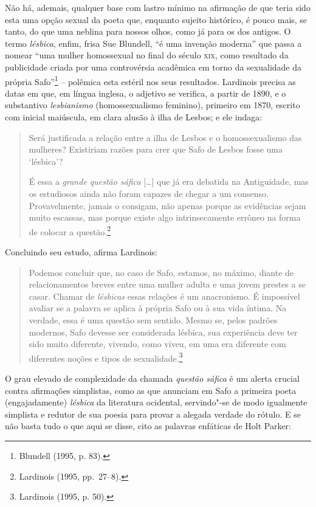 \noindent{}Não há,
ademais, qualquer base com lastro mínimo na afirmação de que teria sido esta
uma opção sexual da poeta que, enquanto sujeito histórico, é pouco mais, se
tanto, do que uma neblina para nossos olhos, como já para os dos antigos. O
termo \textit{lésbica}, enfim, frisa Sue Blundell, “é uma
invenção moderna” que passa a nomear “uma mulher homossexual no final do século
\textsc{xix}, como resultado da publicidade criada por uma controvérsia acadêmica em
torno da sexualidade da própria Safo”\footnote{ Blundell (1995, p. 83).} -- polêmica esta 
estéril nos seus resultados.
Lardinois precisa as datas em que, em
língua inglesa, o adjetivo se verifica, a partir de 1890, e o substantivo
\textit{lesbianismo} (homossexualismo feminino), primeiro em 1870, escrito com
inicial maiúscula, em clara alusão à ilha de Lesbos; e ele indaga:

\begin{quote}
Será justificada a relação entre a ilha de Lesbos e o homossexualismo das
mulheres? Existiriam razões para crer que Safo de Lesbos fosse uma ‘lésbica’?

É essa a \textit{grande questão sáfica} [\ldots{}] que já era debatida na Antiguidade, mas
os estudiosos ainda não foram capazes de chegar a um consenso. Provavelmente,
jamais o consigam, não apenas porque as evidências sejam muito escassas, mas
porque existe algo intrinsecamente errôneo na forma de colocar a questão.\footnote{ Lardinois (1995, pp.~27--8).}
\end{quote}

Concluindo seu estudo, afirma Lardinois:

\begin{quote}
Podemos concluir que, no caso de Safo, estamos, no máximo, diante de
relacionamentos breves entre uma mulher adulta e uma jovem prestes a se casar.
Chamar de \textit{lésbicas} essas relações é um anacronismo. É impossível avaliar se a
palavra se aplica à própria Safo ou à sua vida íntima. Na verdade, essa é uma
questão sem sentido. Mesmo se, pelos padrões modernos, Safo devesse ser
considerada lésbica, sua experiência deve ter sido muito diferente, vivendo,
como viveu, em uma era diferente com diferentes noções e tipos de sexualidade.\footnote{ Lardinois (1995, p. 50).}
\end{quote}

O grau elevado de complexidade da chamada \textit{questão sáfica} é um alerta
crucial contra afirmações simplistas, como as que anunciam em Safo a
primeira poeta (engajadamente) \textit{lésbica} da literatura ocidental,
servindo"-se de modo igualmente simplista e redutor de sua poesia para provar a alegada
verdade do rótulo. E se não basta tudo o que aqui se disse, cito as palavras
enfáticas de Holt Parker: 


